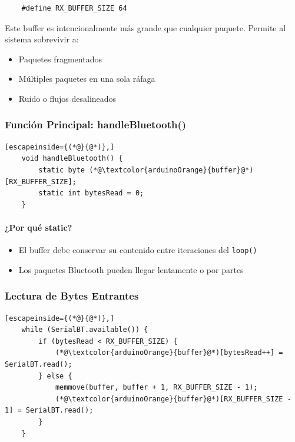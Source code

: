 \documentclass[12pt,a4paper]{article}
\begin{document}
\begin{lstlisting}
	#define RX_BUFFER_SIZE 64
\end{lstlisting}

Este buffer es intencionalmente más grande que cualquier paquete.
Permite al sistema sobrevivir a:

\begin{itemize}
	\item Paquetes fragmentados
	\item Múltiples paquetes en una sola ráfaga
	\item Ruido o flujos desalineados
\end{itemize}

\subsubsection{Función Principal: handleBluetooth()}

\begin{lstlisting}[escapeinside={(*@}{@*)},]
	void handleBluetooth() {
		static byte (*@\textcolor{arduinoOrange}{buffer}@*)[RX_BUFFER_SIZE];
		static int bytesRead = 0;
	}
\end{lstlisting}

\paragraph{¿Por qué static?}

\begin{itemize}
	\item El buffer debe conservar su contenido entre iteraciones del \texttt{loop()}
	\item Los paquetes Bluetooth pueden llegar lentamente o por partes
\end{itemize}

\subsubsection{Lectura de Bytes Entrantes}

\begin{lstlisting}[escapeinside={(*@}{@*)},]
	while (SerialBT.available()) {
		if (bytesRead < RX_BUFFER_SIZE) {
			(*@\textcolor{arduinoOrange}{buffer}@*)[bytesRead++] = SerialBT.read();
		} else {
			memmove(buffer, buffer + 1, RX_BUFFER_SIZE - 1);
			(*@\textcolor{arduinoOrange}{buffer}@*)[RX_BUFFER_SIZE - 1] = SerialBT.read();
		}
	}
\end{lstlisting}
\end{document}
